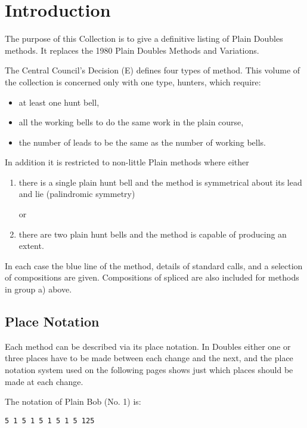 \chapter{Introduction} \label{cha:introduction}

The purpose of this Collection is to give a definitive listing of Plain Doubles
methods.
It replaces the 1980 Plain Doubles Methods and Variations.

The Central Council's Decision (E) defines four types of method.
This volume of the collection is concerned only with one type, hunters,
which require:

\begin{itemize}
  \item at least one hunt bell,
  \item all the working bells to do the same work in the plain course,
  \item the number of leads to be the same as the number of working bells.
\end{itemize}

In addition it is restricted to non-little Plain methods where either

\begin{enumerate}
  \item there is a single plain hunt bell and the method is symmetrical about
  its lead and lie (palindromic symmetry)

  or

  \item there are two plain hunt bells and the method is capable of producing an
  extent.
\end{enumerate}

In each case the blue line of the method, details of standard calls,
and a selection of compositions are given.
Compositions of spliced are also included for methods in group a) above.

\section{Place Notation} \label{sec:place-notation}

Each method can be described via its place notation.
In Doubles either one or three places have to be made between each change and
the next, and the place notation system used on the following pages shows just
which places should be made at each change.

The notation of Plain Bob (No. 1) is:

\begin{verbatim}
5 1 5 1 5 1 5 1 5 125
\end{verbatim}

